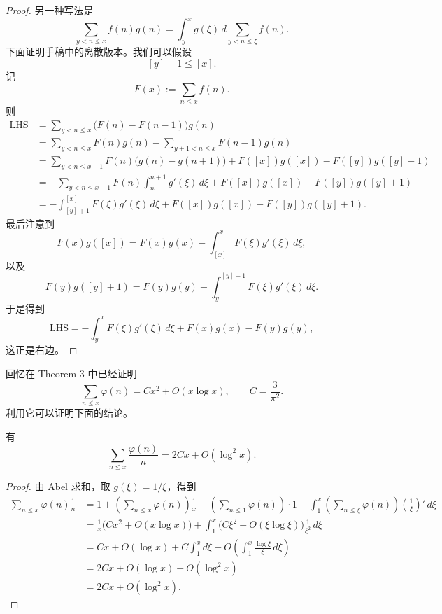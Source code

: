 \begin{proof}
	另一种写法是
	\[
		\sum_{y<n\leq x}f(n)g(n)
		=
		\int_y^x g(\xi)\,d\sum_{y<n\leq \xi}f(n).
	\]
	下面证明手稿中的离散版本。我们可以假设
	\[
		[y]+1\leq [x].
	\]
	记
	\[
		F(x):=\sum_{n\leq x}f(n).
	\]
	则
	\[
	\begin{aligned}
		\text{LHS}
		&=
		\sum_{y<n\leq x}\bigl(F(n)-F(n-1)\bigr)g(n) \\
		&=
		\sum_{y<n\leq x}F(n)g(n)
		-
		\sum_{y+1<n\leq x}F(n-1)g(n) \\
		&=
		\sum_{y<n\leq x-1}F(n)\bigl(g(n)-g(n+1)\bigr)
		+
		F([x])g([x])-F([y])g([y]+1) \\
		&=
		-\sum_{y<n\leq x-1}F(n)\int_n^{n+1}g'(\xi)\,d\xi
		+
		F([x])g([x])-F([y])g([y]+1) \\
		&=
		-\int_{[y]+1}^{[x]}F(\xi)g'(\xi)\,d\xi
		+
		F([x])g([x])-F([y])g([y]+1).
	\end{aligned}
	\]
	最后注意到
	\[
		F(x)g([x])
		=
		F(x)g(x)-\int_{[x]}^xF(\xi)g'(\xi)\,d\xi,
	\]
	以及
	\[
		F(y)g([y]+1)
		=
		F(y)g(y)+\int_y^{[y]+1}F(\xi)g'(\xi)\,d\xi.
	\]
	于是得到
	\[
		\text{LHS}
		=
		-\int_y^x F(\xi)g'(\xi)\,d\xi+F(x)g(x)-F(y)g(y),
	\]
	这正是右边。
\end{proof}

\begin{example}
	回忆在 Theorem 3 中已经证明
	\[
		\sum_{n\leq x}\varphi(n)=Cx^2+O(x\log x),
		\qquad
		C=\frac3{\pi^2}.
	\]
	利用它可以证明下面的结论。
\end{example}

\begin{theorem}[原文 Theorem 6]
	有
	\[
		\sum_{n\leq x}\frac{\varphi(n)}n
		=
		2Cx+O(\log^2 x).
	\]
\end{theorem}

\begin{proof}
	由 Abel 求和，取 $g(\xi)=1/\xi$，得到
	\[
	\begin{aligned}
		\sum_{n\leq x}\varphi(n)\frac1n
		&=
		1+
		\left(\sum_{n\leq x}\varphi(n)\right)\frac1x
		-
		\left(\sum_{n\leq 1}\varphi(n)\right)\cdot 1
		-\int_1^x
		\left(\sum_{n\leq \xi}\varphi(n)\right)
		\left(\frac1\xi\right)'\,d\xi \\
		&=
		\frac1x\bigl(Cx^2+O(x\log x)\bigr)
		+
		\int_1^x
		\bigl(C\xi^2+O(\xi\log \xi)\bigr)\frac1{\xi^2}\,d\xi \\
		&=
		Cx+O(\log x)
		+
		C\int_1^x d\xi
		+
		O\left(\int_1^x\frac{\log \xi}{\xi}\,d\xi\right) \\
		&=
		2Cx+O(\log x)+O(\log^2 x) \\
		&=
		2Cx+O(\log^2 x).
	\end{aligned}
	\]
\end{proof}

